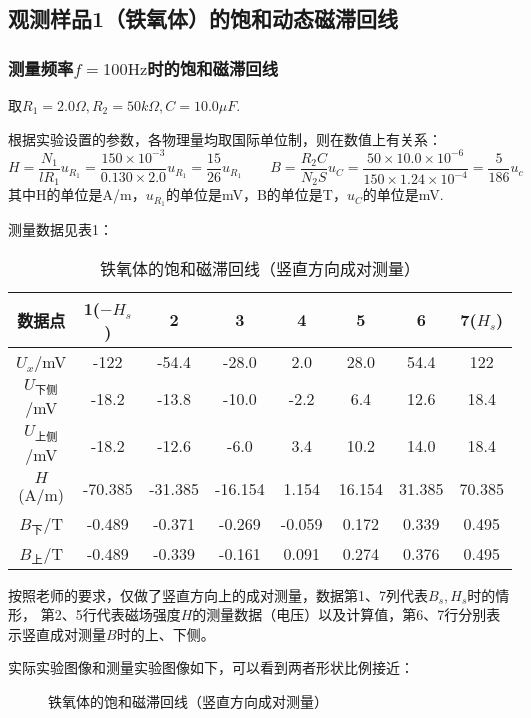 \documentclass[11pt]{article}
\begin{document}
\newpage
\subsection{观测样品1（铁氧体）的饱和动态磁滞回线}

\subsubsection{测量频率$f=100\text{Hz}$时的饱和磁滞回线}

取$R_1=2.0\Omega,R_2=50k\Omega,C=10.0\mu F$.

根据实验设置的参数，各物理量均取国际单位制，则在数值上有关系：
\[
    H=\frac{N_1}{l R_1}u_{R_1}=\frac{150\times 10^{-3}}{0.130\times 2.0}u_{R_1}=\frac{15}{26}u_{R_1}\qquad
    B = \frac{R_2 C}{N_2 S}u_C=\frac{50\times 10.0\times 10^{-6}}{150\times 1.24\times 10^{-4}}=\frac{5}{186}u_c
\]
其中H的单位是A/m，$u_{R_1}$的单位是mV，B的单位是T，$u_C$的单位是mV.


测量数据见表1：
\begin{table}[!ht]
    \centering
    \begin{tabular}{cccccccc}
        \toprule
        数据点 & 1($-H_s$) & 2 & 3 & 4 & 5 & 6 & 7($H_s$) \\ \midrule
        $U_x$/mV & -122 & -54.4 & -28.0 & 2.0 & 28.0 & 54.4 & 122 \\ 
        $U_{下侧}$/mV & -18.2 & -13.8 & -10.0 & -2.2 & 6.4 & 12.6 & 18.4 \\ 
        $U_{上侧}$/mV & -18.2 & -12.6 & -6.0 & 3.4 & 10.2 & 14.0 & 18.4 \\ \midrule
        $H$(A/m)  & -70.385  & -31.385  & -16.154  & 1.154  & 16.154  & 31.385  & 70.385  \\ 
        $B_{下}$/T & -0.489  & -0.371  & -0.269  & -0.059  & 0.172  & 0.339  & 0.495  \\ 
        $B_{上}$/T & -0.489  & -0.339  & -0.161  & 0.091  & 0.274  & 0.376  & 0.495 \\ 
        \bottomrule
    \end{tabular}
    \caption{铁氧体的饱和磁滞回线（竖直方向成对测量）}
\end{table}

按照老师的要求，仅做了竖直方向上的成对测量，数据第1、7列代表$B_s,H_s$时的情形，
第2、5行代表磁场强度$H$的测量数据（电压）以及计算值，第6、7行分别表示竖直成对测量$B$时的上、下侧。

实际实验图像和测量实验图像如下，可以看到两者形状比例接近：

\begin{figure}[H]
    \centering
    \hspace{0.5cm}
    \caption{ 铁氧体的饱和磁滞回线（竖直方向成对测量）}
\end{figure}
\end{document}
